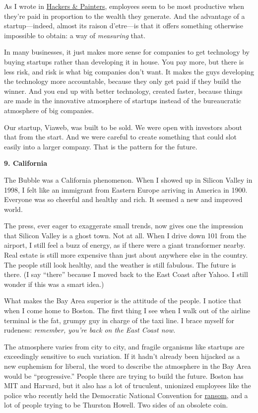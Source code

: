 As I wrote in \href{hackpaint.html}{Hackers \& Painters}, employees seem
to be most productive when they're paid in proportion to the wealth they
generate. And the advantage of a startup---indeed, almost its raison
d'etre---is that it offers something otherwise impossible to obtain: a
way of \emph{measuring} that.

In many businesses, it just makes more sense for companies to get
technology by buying startups rather than developing it in house. You
pay more, but there is less risk, and risk is what big companies don't
want. It makes the guys developing the technology more accountable,
because they only get paid if they build the winner. And you end up with
better technology, created faster, because things are made in the
innovative atmosphere of startups instead of the bureaucratic atmosphere
of big companies.

Our startup, Viaweb, was built to be sold. We were open with investors
about that from the start. And we were careful to create something that
could slot easily into a larger company. That is the pattern for the
future.

\textbf{9. California}

The Bubble was a California phenomenon. When I showed up in Silicon
Valley in 1998, I felt like an immigrant from Eastern Europe arriving in
America in 1900. Everyone was so cheerful and healthy and rich. It
seemed a new and improved world.

The press, ever eager to exaggerate small trends, now gives one the
impression that Silicon Valley is a ghost town. Not at all. When I drive
down 101 from the airport, I still feel a buzz of energy, as if there
were a giant transformer nearby. Real estate is still more expensive
than just about anywhere else in the country. The people still look
healthy, and the weather is still fabulous. The future is there. (I say
``there'' because I moved back to the East Coast after Yahoo. I still
wonder if this was a smart idea.)

What makes the Bay Area superior is the attitude of the people. I notice
that when I come home to Boston. The first thing I see when I walk out
of the airline terminal is the fat, grumpy guy in charge of the taxi
line. I brace myself for rudeness: \emph{remember, you're back on the
East Coast now.}

The atmosphere varies from city to city, and fragile organisms like
startups are exceedingly sensitive to such variation. If it hadn't
already been hijacked as a new euphemism for liberal, the word to
describe the atmosphere in the Bay Area would be ``progressive.'' People
there are trying to build the future. Boston has MIT and Harvard, but it
also has a lot of truculent, unionized employees like the police who
recently held the Democratic National Convention for
\href{http://www.usatoday.com/news/politicselections/nation/president/2004-04-30-boston-police-convention_x.htm}{ransom},
and a lot of people trying to be Thurston Howell. Two sides of an
obsolete coin.


